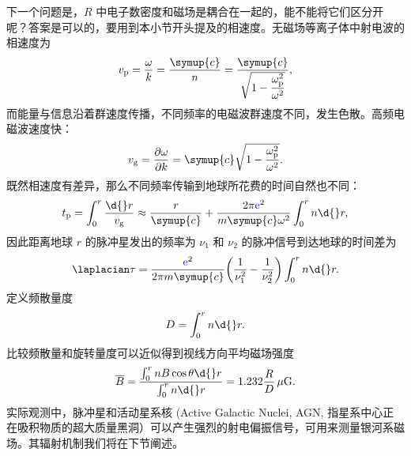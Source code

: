 \documentclass[../天体物理基础.tex]{subfiles}
\begin{document}
下一个问题是，$R$ 中电子数密度和磁场是耦合在一起的，能不能将它们区分开呢？答案是可以的，要用到本小节开头提及的相速度。无磁场等离子体中射电波的相速度为
\begin{equation}
v_{\mathrm{p}}=\frac{\omega}{k}=\frac{\symup{c}}{n}=\frac{\symup{c}}{\sqrt{1-\dfrac{\omega_{\mathrm{p}}^{2}}{\omega^{2}}}},
\end{equation}
而能量与信息沿着群速度传播，不同频率的电磁波群速度不同，发生色散。高频电磁波速度快：
\begin{equation}
v_{\mathrm{g}}=\frac{\partial\omega}{\partial{}k}=\symup{c}\sqrt{1-\frac{\omega_{\mathrm{p}}^{2}}{\omega^{2}}}.
\end{equation}
既然相速度有差异，那么不同频率传输到地球所花费的时间自然也不同：
\begin{equation}
t_{\mathrm{p}}=\int_{0}^{r}\frac{\d{}r}{v_{\mathrm{g}}}\approx\frac{r}{\symup{c}}+\frac{2\pi{\color{blue}{\ce{e}}}^{2}}{m\symup{c}\omega^{2}}\int_{0}^{r}n\d{}r,
\end{equation}
因此距离地球 $r$ 的脉冲星发出的频率为 $\nu_{1}$ 和 $\nu_{2}$ 的脉冲信号到达地球的时间差为
\begin{equation}
\laplacian\tau=\frac{{\color{blue}{\ce{e}}}^{2}}{2\pi m\symup{c}}\mleft(\frac{1}{\nu_{1}^{2}}-\frac{1}{\nu_{2}^{2}}\mright)\int_{0}^{r}n\d{}r.
\end{equation}
定义频散量度
\begin{equation}
D=\int_{0}^{r}n\d{}r.
\end{equation}
比较频散量和旋转量度可以近似得到视线方向平均磁场强度
\begin{equation}
\overline{B}=\frac{\int_{0}^{r}nB\cos{\theta}\d{}r}{\int_{0}^{r}n\d{}r}=1.232\frac{R}{D}\,\unit{\mu G}.
\end{equation}
实际观测中，脉冲星和活动星系核 (Active Galactic Nuclei, AGN, 指星系中心正在吸积物质的超大质量黑洞）可以产生强烈的射电偏振信号，可用来测量银河系磁场。其辐射机制我们将在下节阐述。

\newpage
\end{document}
